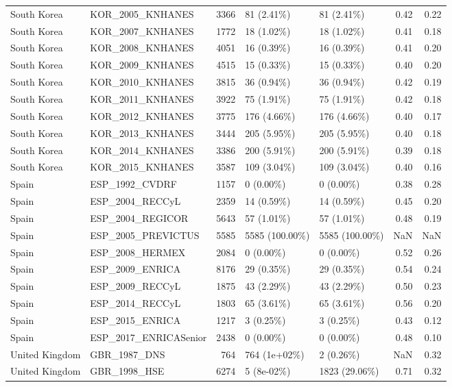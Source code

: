 \begin{longtable}{llrllrr}
\addlinespace
South Korea & KOR\_2005\_KNHANES & 3366 & 81 (2.41\%) & 81 (2.41\%) & 0.42 & 0.22\\
South Korea & KOR\_2007\_KNHANES & 1772 & 18 (1.02\%) & 18 (1.02\%) & 0.41 & 0.18\\
South Korea & KOR\_2008\_KNHANES & 4051 & 16 (0.39\%) & 16 (0.39\%) & 0.41 & 0.20\\
South Korea & KOR\_2009\_KNHANES & 4515 & 15 (0.33\%) & 15 (0.33\%) & 0.40 & 0.20\\
South Korea & KOR\_2010\_KNHANES & 3815 & 36 (0.94\%) & 36 (0.94\%) & 0.42 & 0.19\\
South Korea & KOR\_2011\_KNHANES & 3922 & 75 (1.91\%) & 75 (1.91\%) & 0.42 & 0.18\\
South Korea & KOR\_2012\_KNHANES & 3775 & 176 (4.66\%) & 176 (4.66\%) & 0.40 & 0.17\\
South Korea & KOR\_2013\_KNHANES & 3444 & 205 (5.95\%) & 205 (5.95\%) & 0.40 & 0.18\\
South Korea & KOR\_2014\_KNHANES & 3386 & 200 (5.91\%) & 200 (5.91\%) & 0.39 & 0.18\\
South Korea & KOR\_2015\_KNHANES & 3587 & 109 (3.04\%) & 109 (3.04\%) & 0.40 & 0.16\\
\addlinespace
Spain & ESP\_1992\_CVDRF & 1157 & 0 (0.00\%) & 0 (0.00\%) & 0.38 & 0.28\\
Spain & ESP\_2004\_RECCyL & 2359 & 14 (0.59\%) & 14 (0.59\%) & 0.45 & 0.20\\
Spain & ESP\_2004\_REGICOR & 5643 & 57 (1.01\%) & 57 (1.01\%) & 0.48 & 0.19\\
Spain & ESP\_2005\_PREVICTUS & 5585 & 5585 (100.00\%) & 5585 (100.00\%) & NaN & NaN\\
Spain & ESP\_2008\_HERMEX & 2084 & 0 (0.00\%) & 0 (0.00\%) & 0.52 & 0.26\\
Spain & ESP\_2009\_ENRICA & 8176 & 29 (0.35\%) & 29 (0.35\%) & 0.54 & 0.24\\
Spain & ESP\_2009\_RECCyL & 1875 & 43 (2.29\%) & 43 (2.29\%) & 0.50 & 0.23\\
Spain & ESP\_2014\_RECCyL & 1803 & 65 (3.61\%) & 65 (3.61\%) & 0.56 & 0.20\\
Spain & ESP\_2015\_ENRICA & 1217 & 3 (0.25\%) & 3 (0.25\%) & 0.43 & 0.12\\
Spain & ESP\_2017\_ENRICASenior & 2438 & 0 (0.00\%) & 0 (0.00\%) & 0.48 & 0.10\\
\addlinespace
United Kingdom & GBR\_1987\_DNS & 764 & 764 (1e+02\%) & 2 (0.26\%) & NaN & 0.32\\
United Kingdom & GBR\_1998\_HSE & 6274 & 5 (8e-02\%) & 1823 (29.06\%) & 0.71 & 0.32\\

\end{longtable}
